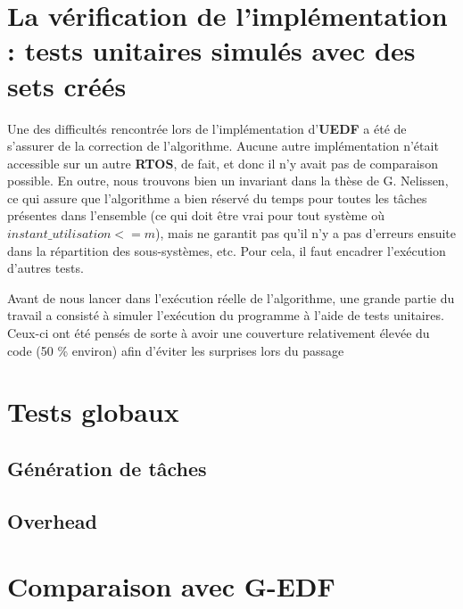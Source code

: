 \section{La vérification de l'implémentation : tests unitaires simulés avec des sets créés}

	Une des difficultés rencontrée lors de l'implémentation d'\textbf{UEDF} a été de s'assurer de la correction de l'algorithme. 
	Aucune autre implémentation n'était accessible sur un autre \textbf{RTOS}, de fait, et donc il n'y avait pas de 
	comparaison possible. En outre, nous trouvons bien un invariant dans la thèse de G. Nelissen, ce qui assure 
	que l'algorithme a bien réservé du temps pour toutes les tâches présentes dans l'ensemble 
	(ce qui doit être vrai pour tout système où $instant\_utilisation <= m$), mais ne garantit pas 
	qu'il n'y a pas d'erreurs ensuite dans la répartition des sous-systèmes, etc. Pour cela, il faut encadrer 
	l'exécution d'autres tests. \newline

	Avant de nous lancer dans l'exécution réelle de l'algorithme, une grande partie du travail a consisté 
	à simuler l'exécution du programme à l'aide de tests unitaires. Ceux-ci ont été pensés de sorte à avoir 
	une couverture relativement élevée du code (50 \% environ) afin d'éviter les surprises lors du passage 
	

\section{Tests globaux}

\subsection{Génération de tâches}

\subsection{Overhead}

\section{Comparaison avec G-EDF}
